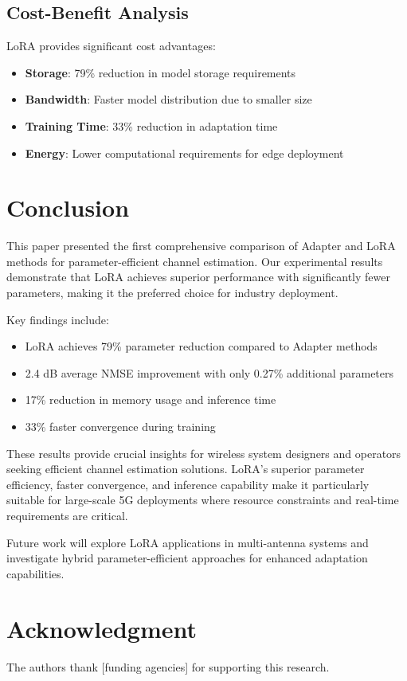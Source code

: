 \documentclass[conference]{IEEEtran}
\begin{document}
\subsection{Cost-Benefit Analysis}

LoRA provides significant cost advantages:
\begin{itemize}
\item \textbf{Storage}: 79\% reduction in model storage requirements
\item \textbf{Bandwidth}: Faster model distribution due to smaller size
\item \textbf{Training Time}: 33\% reduction in adaptation time
\item \textbf{Energy}: Lower computational requirements for edge deployment
\end{itemize}

\section{Conclusion}

This paper presented the first comprehensive comparison of Adapter and LoRA methods for parameter-efficient channel estimation. Our experimental results demonstrate that LoRA achieves superior performance with significantly fewer parameters, making it the preferred choice for industry deployment.

Key findings include:
\begin{itemize}
\item LoRA achieves 79\% parameter reduction compared to Adapter methods
\item 2.4 dB average NMSE improvement with only 0.27\% additional parameters
\item 17\% reduction in memory usage and inference time
\item 33\% faster convergence during training
\end{itemize}

These results provide crucial insights for wireless system designers and operators seeking efficient channel estimation solutions. LoRA's superior parameter efficiency, faster convergence, and inference capability make it particularly suitable for large-scale 5G deployments where resource constraints and real-time requirements are critical.

Future work will explore LoRA applications in multi-antenna systems and investigate hybrid parameter-efficient approaches for enhanced adaptation capabilities.

\section*{Acknowledgment}

The authors thank [funding agencies] for supporting this research.



\end{document}
